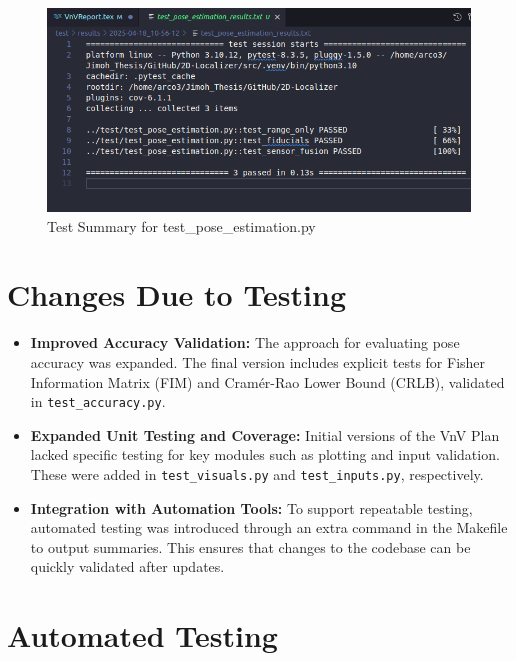 \documentclass[12pt, titlepage]{article}
\begin{document}
\begin{figure}[H]
  \centering
  \includegraphics[width=1\textwidth]{test_summary.png}
  \caption{Test Summary for test\_pose\_estimation.py}
\end{figure}

\section{Changes Due to Testing}


\begin{itemize}
  \item \textbf{Improved Accuracy Validation:} The approach for evaluating pose accuracy was expanded. The final version includes explicit tests for Fisher Information Matrix (FIM) and Cramér-Rao Lower Bound (CRLB), validated in \texttt{test\_accuracy.py}.

  \item \textbf{Expanded Unit Testing and Coverage:} Initial versions of the VnV Plan lacked specific testing for key modules such as plotting and input validation. These were added in \texttt{test\_visuals.py} and \texttt{test\_inputs.py}, respectively.

  \item \textbf{Integration with Automation Tools:} To support repeatable testing, automated testing was introduced through an extra command in the Makefile to output summaries. This ensures that changes to the codebase can be quickly validated after updates.
\end{itemize}

\section{Automated Testing}
\end{document}
